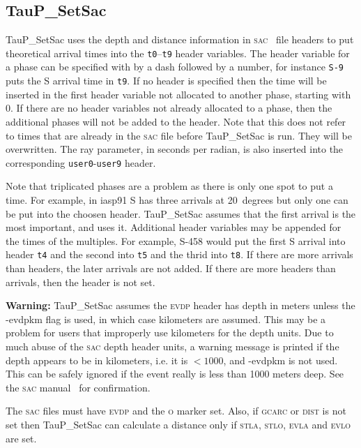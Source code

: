\subsection{TauP\_SetSac}
TauP\_SetSac uses the depth and distance information in
\textsc{sac}~\cite{sacmanual}
 file headers to
put theoretical arrival times into the \texttt{t0}--\texttt{t9}
header variables. The header variable for a phase can be specified with by
a dash followed by a number, for instance \texttt{S-9} puts the S arrival time
in \texttt{t9}. If no header is specified then the time will be inserted in the
first header variable not allocated to another phase, starting with 0.
If there are no header variables not already allocated to a phase, then the
additional phases will not be added to the header. Note that this does not refer to times that are already in the \textsc{sac} file before TauP\_SetSac is run. They will be overwritten. The ray parameter, in seconds per radian, is also
inserted into the corresponding \texttt{user0}-\texttt{user9} header.

Note that triplicated phases are a problem as there is only one
spot to put a time. For example, in iasp91 S has three arrivals at 20~degrees but only
one can be put into the choosen header. TauP\_SetSac assumes that the first arrival
is the most important, and uses it. Additional header variables may be appended for
the times of the multiples. For example, S-458 would put the first S arrival into
header \texttt{t4} and the second into \texttt{t5} and the thrid into \texttt{t8}.
If there are more arrivals than headers, the later arrivals are not added. If there are
more headers than arrivals, then the header is not set.

\textbf{Warning:} TauP\_SetSac assumes the \textsc{evdp} header has depth in meters unless
the -evdpkm
flag is used, in which case kilometers are assumed. This may be a problem for
users that improperly use kilometers for the depth units. Due to much
abuse of the \textsc{sac} depth header units, a warning message is
printed if the depth
appears to be in kilometers, i.e. it is $< 1000$, and -evdpkm is not used.
This can be safely ignored
if the event really is less than 1000 meters deep. See the \textsc{sac}
manual~\cite{sacmanual} for confirmation.

The \textsc{sac} files must have \textsc{evdp} and the \textsc{o} marker set.
Also, if \textsc{gcarc} or \textsc{dist} is not
set then TauP\_SetSac can calculate a distance only if
\textsc{stla}, \textsc{stlo}, \textsc{evla} and \textsc{evlo}
are set.

